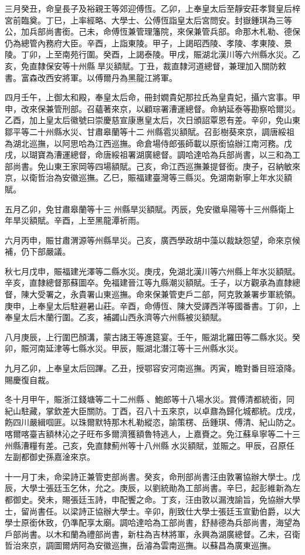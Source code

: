 \begin{pinyinscope}
三月癸丑，命皇長子及裕親王等郊迎傅恆。乙卯，上奉皇太后至靜安莊孝賢皇后梓宮前臨奠。丁巳，上率經略、大學士、公傅恆詣皇太后宮問安。封嶽鍾琪為三等公，加兵部尚書銜。己未，命傅恆兼管理籓院，來保兼管兵部。命那木札勒、德保仍為總管內務府大臣。辛酉，上詣東陵。甲子，上謁昭西陵、孝陵、孝東陵、景陵。丁卯，上至南苑行圍。癸酉，上謁泰陵。甲戌，賑湖北漢川等六州縣水災。乙亥，免直隸保安等十州縣旱災額賦。丁丑，裁直隸河道總督，兼理加入關防敕書。富森改西安將軍。以傅爾丹為黑龍江將軍。

四月壬午，上御太和殿，奉皇太后命，冊封嫺貴妃那拉氏為皇貴妃，攝六宮事。甲申，改來保兼管刑部。召蘊著來京，以顧琮署漕運總督。命納延泰等勘察哈爾災。乙酉，加上皇太后徽號曰崇慶慈宣康惠皇太后，次日頒詔覃恩有差。辛卯，免山東鄒平等二十州縣水災、甘肅皋蘭等十二州縣雹災額賦。召彭樹葵來京，調唐綏祖為湖北巡撫，以阿思哈為江西巡撫。命倉場侍郎張師載以原銜協辦江南河務。戊戌，以瑚寶為漕運總督，命唐綏祖署湖廣總督。調哈達哈為兵部尚書，以三和為工部尚書。免山東王家岡等四場額賦。己亥，命江西巡撫兼提督銜。庚子，召納敏來京，以衛哲治為安徽巡撫。乙巳，賑福建臺灣等三縣災。免湖南新寧上年水災額賦。

五月乙卯，免甘肅皋蘭等十三州縣旱災額賦。丙辰，免安徽阜陽等十三州縣衛上年旱災額賦。辛酉，上至黑龍潭祈雨。

六月丙申，賑甘肅渭源等州縣旱災。己亥，廣西學政胡中藻以裁缺怨望，命來京候補，仍下部嚴議。

秋七月戊申，賑福建光澤等二縣水災。庚戌，免湖北漢川等六州縣上年水災額賦。辛亥，直隸總督那蘇圖卒。免福建晉江等九縣潮災額賦。壬子，以方觀承為直隸總督，陳大受署之，永貴署山東巡撫。命來保兼管吏戶二部，阿克敦兼署步軍統領。庚申，上奉皇太后駐避暑山莊。辛酉，命傅恆、陳大受譯西洋等國番書。丁卯，上奉皇太后木蘭行圍。乙亥，補蠲山西永濟等六州縣被災額賦。

八月庚辰，上行圍巴顏溝，蒙古諸王等進筵宴。壬午，賑湖北羅田等二縣水災。癸卯，賑河南延津等七縣水災。甲辰，賑湖北潛江等十三州縣水災。

九月乙卯，上奉皇太后回蹕。乙丑，授鄂容安河南巡撫。丙寅，瞻對番目班滾降。賜慶復自裁。

冬十月甲午，賑浙江錢塘等二十二州縣、鮑郎等十八場水災。賞傅清都統銜，同紀山駐藏，掌欽差大臣關防。丁酉，召八十五來京，以卓鼐為歸化城都統。戊戌，飭四川嚴緝啯匪。以珠爾默特那木札勒縱恣，諭策楞、岳鍾琪、傅清、紀山防之。喀爾喀臺吉額林沁之子旺布多爾濟獲額魯特逃人，上嘉賚之。免江蘇阜寧等二十三州縣漕糧有差。己亥，免直隸薊州等十八州縣水災額賦，並賑之。甲辰，召原任左副都御史孫嘉淦來京。

十一月丁未，命梁詩正兼管吏部尚書。癸亥，命刑部尚書汪由敦署協辦大學士。戊辰，大學士張廷玉乞休，允之。庚辰，以劉統勛為工部尚書。辛巳，起彭維新為左都御史。癸未，賜張廷玉詩，申配饗之命。丁亥，汪由敦以漏洩諭旨，免協辦大學士，留尚書任。以梁詩正協辦大學士。辛卯，削致仕大學士張廷玉宣勤伯爵，以大學士原銜休致，仍準配享太廟。調哈達哈為工部尚書，舒赫德為兵部尚書，海望為戶部尚書。以木和蘭為禮部尚書，新柱為吉林將軍，永興為湖廣總督。乙未，召衛哲治來京，調圖爾炳阿為安徽巡撫，岳濬為雲南巡撫。以蘇昌為廣東巡撫。


\end{pinyinscope}
